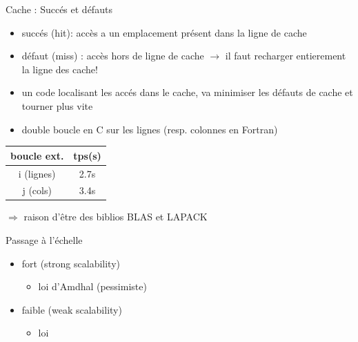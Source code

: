 \documentclass[11pt,mathserif]{beamer}
\begin{document}
\begin{frame}{Cache : Succés et défauts}
\begin{itemize}[<+->]
 \item succés (hit): accès a un emplacement présent dans la ligne de cache 
 \item défaut (miss) : accès hors de ligne de cache $\rightarrow$ il faut recharger entierement la ligne des cache!
 \item un code localisant les accés dans le cache, va minimiser les défauts de cache et tourner plus vite
 \item double boucle en C sur les lignes (resp. colonnes en Fortran)
\end{itemize}
\pause
\begin{minipage}[c]{0.49\linewidth}
  
\end{minipage}
\begin{minipage}[c]{0.49\linewidth}
    \begin{tabular}{|c|c|}
    \hline
     boucle ext. & tps(s)  \\
    \hline
      i (lignes) & 2.7s \\
      j (cols)  & 3.4s \\
    \hline
    \end{tabular}
\end{minipage}
\pause 
 $\Rightarrow$ raison d'être des biblios BLAS et LAPACK
\end{frame}
\begin{frame}{Passage à l'échelle}
\begin{itemize}[<+->]
  \item fort (strong scalability)
    \begin{itemize} 
       \item loi d'Amdhal (pessimiste)
    \end{itemize}
  \item faible (weak scalability)
    \begin{itemize}
      \item loi
    \end{itemize}
\end{itemize}
\end{frame}
\end{document}
